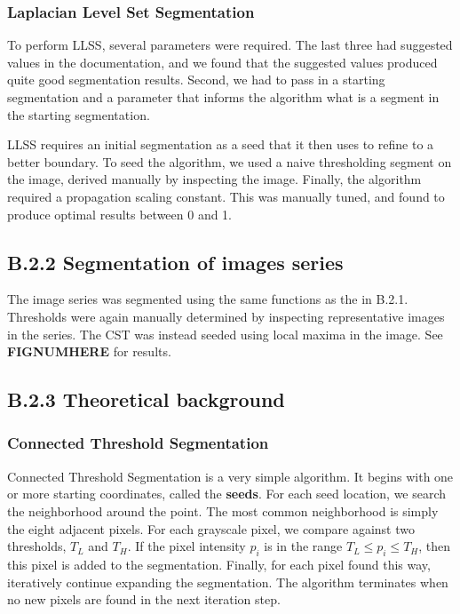\documentclass{article}
\begin{document}
\subsubsection*{Laplacian Level Set Segmentation}
To perform LLSS, several parameters were required. The last three had suggested values in the documentation, and we found that the suggested values produced quite good segmentation results. Second, we had to pass in a starting segmentation and a parameter that informs the algorithm what is a segment in the starting segmentation.

LLSS requires an initial segmentation as a seed that it then uses to refine to a better boundary. To seed the algorithm, we used a naive thresholding segment on the image, derived manually by inspecting the image. Finally, the algorithm required a propagation scaling constant. This was manually tuned, and found to produce optimal results between 0 and 1.



\subsection*{B.2.2 Segmentation of images series}

The image series was segmented using the same functions as the in B.2.1. Thresholds were again manually determined by inspecting representative images in the series. The CST was instead seeded using local maxima in the image. See {\bf FIGNUMHERE} for results.



\subsection*{B.2.3 Theoretical background}

\subsubsection*{Connected Threshold Segmentation}
Connected Threshold Segmentation is a very simple algorithm. It begins with one or more starting coordinates, called the {\bf seeds}. For each seed location, we search the neighborhood around the point. The most common neighborhood is simply the eight adjacent pixels. For each grayscale pixel, we compare against two thresholds, $T_L$ and $T_H$. If the pixel intensity $p_i$ is in the range $T_L \leq p_i \leq T_H$, then this pixel is added to the segmentation. Finally, for each pixel found this way, iteratively continue expanding the segmentation. The algorithm terminates when no new pixels are found in the next iteration step.\cite{svi}
\end{document}
